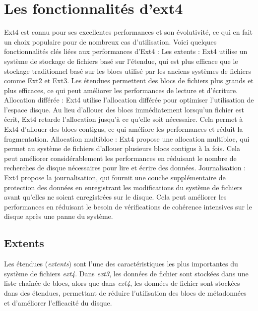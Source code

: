 \documentclass[12pt, letterpaper]{report}
\begin{document}
\chapter{Les fonctionnalités d'ext4}
Ext4 est connu pour ses excellentes performances et son évolutivité, ce qui en fait un choix populaire pour de nombreux cas d'utilisation. Voici quelques fonctionnalités clés liées aux performances d'Ext4 :\newline
Les extents : Ext4 utilise un système de stockage de fichiers basé sur l'étendue, qui est plus efficace que le stockage traditionnel basé sur les blocs utilisé par les anciens systèmes de fichiers comme Ext2 et Ext3. Les étendues permettent des blocs de fichiers plus grands et plus efficaces, ce qui peut améliorer les performances de lecture et d'écriture.\newline
Allocation différée : Ext4 utilise l'allocation différée pour optimiser l'utilisation de l'espace disque. Au lieu d'allouer des blocs immédiatement lorsqu'un fichier est écrit, Ext4 retarde l'allocation jusqu'à ce qu'elle soit nécessaire. Cela permet à Ext4 d'allouer des blocs contigus, ce qui améliore les performances et réduit la fragmentation.\newline
Allocation multibloc : Ext4 propose une allocation multibloc, qui permet au système de fichiers d'allouer plusieurs blocs contigus à la fois. Cela peut améliorer considérablement les performances en réduisant le nombre de recherches de disque nécessaires pour lire et écrire des données.\newline
Journalisation : Ext4 propose la journalisation, qui fournit une couche supplémentaire de protection des données en enregistrant les modifications du système de fichiers avant qu'elles ne soient enregistrées sur le disque. Cela peut améliorer les performances en réduisant le besoin de vérifications de cohérence intensives sur le disque après une panne du système.
\section{Extents}
Les étendues (\textit{extents}) sont l'une des caractéristiques les plus importantes du système de fichiers \textit{ext4}. Dans \textit{ext3}, les données de fichier sont stockées dans une liste chaînée de blocs, alors que dans \textit{ext4}, les données de fichier sont stockées dans des étendues, permettant de réduire l'utilisation des blocs de métadonnées et d'améliorer l'efficacité du disque.
\end{document}
